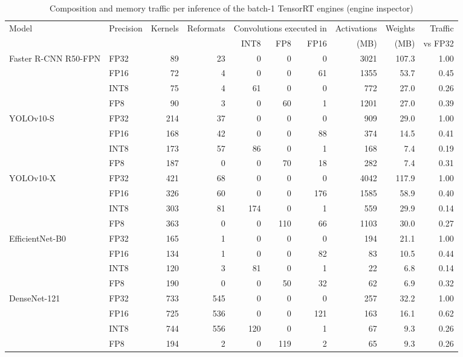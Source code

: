 \documentclass[pdflatex,sn-mathphys-num]{sn-jnl}%
\theoremstyle{thmstyleone}%
\theoremstyle{thmstyletwo}%
\theoremstyle{thmstylethree}%
\begin{document}
\begin{appendices}
\begin{table}
\footnotesize\setlength{\tabcolsep}{4pt}
\caption{Composition and memory traffic per inference of the batch-1 TensorRT engines (engine inspector)}\label{tab:engines}
\begin{tabular}{@{}llrrrrrrrr@{}}
\toprule
Model & Precision & Kernels & Reformats & \multicolumn{3}{c}{Convolutions executed in} & Activations & Weights & Traffic \\
\cmidrule{5-7}
 & & & & INT8 & FP8 & FP16 & (MB) & (MB) & vs FP32 \\
\midrule
Faster R-CNN R50-FPN & FP32 & 89 & 23 & 0 & 0 & 0 & 3021 & 107.3 & 1.00 \\
 & FP16 & 72 & 4 & 0 & 0 & 61 & 1355 & 53.7 & 0.45 \\
 & INT8 & 75 & 4 & 61 & 0 & 0 & 772 & 27.0 & 0.26 \\
 & FP8 & 90 & 3 & 0 & 60 & 1 & 1201 & 27.0 & 0.39 \\
\midrule
YOLOv10-S & FP32 & 214 & 37 & 0 & 0 & 0 & 909 & 29.0 & 1.00 \\
 & FP16 & 168 & 42 & 0 & 0 & 88 & 374 & 14.5 & 0.41 \\
 & INT8 & 173 & 57 & 86 & 0 & 1 & 168 & 7.4 & 0.19 \\
 & FP8 & 187 & 0 & 0 & 70 & 18 & 282 & 7.4 & 0.31 \\
\midrule
YOLOv10-X & FP32 & 421 & 68 & 0 & 0 & 0 & 4042 & 117.9 & 1.00 \\
 & FP16 & 326 & 60 & 0 & 0 & 176 & 1585 & 58.9 & 0.40 \\
 & INT8 & 303 & 81 & 174 & 0 & 1 & 559 & 29.9 & 0.14 \\
 & FP8 & 363 & 0 & 0 & 110 & 66 & 1103 & 30.0 & 0.27 \\
\midrule
EfficientNet-B0 & FP32 & 165 & 1 & 0 & 0 & 0 & 194 & 21.1 & 1.00 \\
 & FP16 & 134 & 1 & 0 & 0 & 82 & 83 & 10.5 & 0.44 \\
 & INT8 & 120 & 3 & 81 & 0 & 1 & 22 & 6.8 & 0.14 \\
 & FP8 & 190 & 0 & 0 & 50 & 32 & 62 & 6.9 & 0.32 \\
\midrule
DenseNet-121 & FP32 & 733 & 545 & 0 & 0 & 0 & 257 & 32.2 & 1.00 \\
 & FP16 & 725 & 536 & 0 & 0 & 121 & 163 & 16.1 & 0.62 \\
 & INT8 & 744 & 556 & 120 & 0 & 1 & 67 & 9.3 & 0.26 \\
 & FP8 & 194 & 2 & 0 & 119 & 2 & 65 & 9.3 & 0.26 \\

\end{tabular}
\end{table}
\end{appendices}
\end{document}
